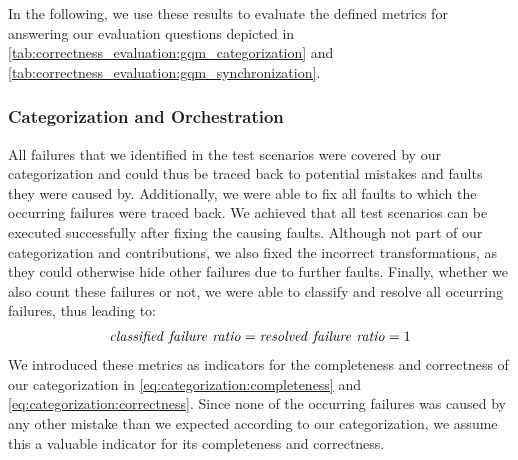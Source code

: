 In the following, we use these results to evaluate the defined metrics for answering our evaluation questions depicted in \autoref{tab:correctness_evaluation:gqm_categorization} and \autoref{tab:correctness_evaluation:gqm_synchronization}.







\subsubsection{Categorization and Orchestration}

All failures that we identified in the test scenarios were covered by our categorization and could thus be traced back to potential mistakes and faults they were caused by.
Additionally, we were able to fix all faults to which the occurring failures were traced back.
We achieved that all test scenarios can be executed successfully after fixing the causing faults.
Although not part of our categorization and contributions, we also fixed the incorrect transformations, as they could otherwise hide other failures due to further faults.
Finally, whether we also count these failures or not, we were able to classify and resolve all occurring failures, thus leading to:
\begin{align*}
    \mathvariable{classified\ failure\ ratio} = \mathvariable{resolved\ failure\ ratio} = 1
\end{align*}
We introduced these metrics as indicators for the completeness and correctness of our categorization in \autoref{eq:categorization:completeness} and \autoref{eq:categorization:correctness}.
Since none of the occurring failures was caused by any other mistake than we expected according to our categorization, we assume this a valuable indicator for its completeness and correctness.

